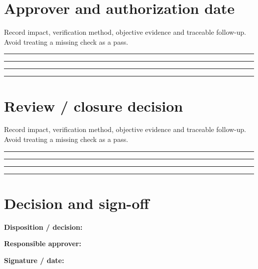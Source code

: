 \documentclass[10pt,letterpaper]{article}
\begin{document}
\section{Approver and authorization date}
Record impact, verification method, objective evidence and traceable follow-up. Avoid treating a missing check as a pass.\par\medskip
\noindent\rule{\linewidth}{0.4pt}\par\vspace{16pt}
\noindent\rule{\linewidth}{0.4pt}\par\vspace{16pt}
\noindent\rule{\linewidth}{0.4pt}\par\vspace{16pt}
\noindent\rule{\linewidth}{0.4pt}\par\vspace{16pt}
\section{Review / closure decision}
Record impact, verification method, objective evidence and traceable follow-up. Avoid treating a missing check as a pass.\par\medskip
\noindent\rule{\linewidth}{0.4pt}\par\vspace{16pt}
\noindent\rule{\linewidth}{0.4pt}\par\vspace{16pt}
\noindent\rule{\linewidth}{0.4pt}\par\vspace{16pt}
\noindent\rule{\linewidth}{0.4pt}\par\vspace{16pt}
\section{Decision and sign-off}
\noindent\textbf{Disposition / decision:}\quad\hrulefill\par\vspace{11pt}
\noindent\textbf{Responsible approver:}\quad\hrulefill\par\vspace{11pt}
\noindent\textbf{Signature / date:}\quad\hrulefill\par\vspace{11pt}
\end{document}
